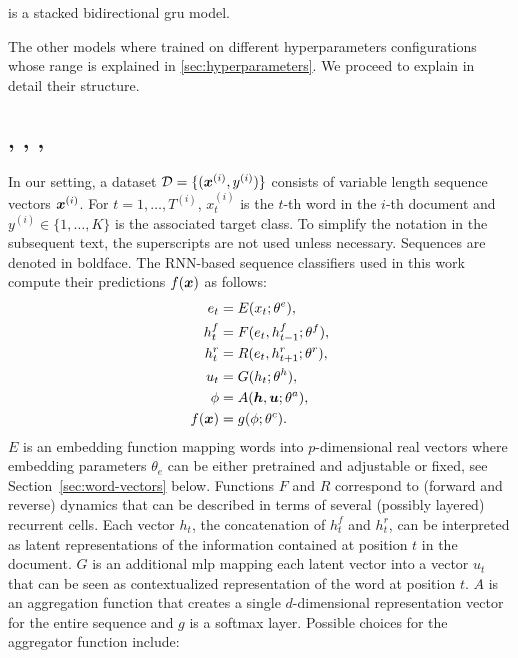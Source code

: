 \gru{} is a stacked bidirectional \ac{gru} model.

The other models where trained on different hyperparameters
configurations whose range is explained in
\cref{sec:hyperparameters}. We proceed to explain in detail their
structure.
\subsection{\maxp, \softmax, \maxi, \softmaxi}
\label{sec:model}
In our setting, a dataset $\mathcal{D}=\{(\bm{x}^{(i)},y^{(i)})\}$
consists of variable length sequence vectors $\bm{x}^{(i)}$. For
$t=1,\dots,T^{(i)}$, $x^{(i)}_t$ is the $t$-th word in the $i$-th
document and $y^{(i)}\in\{1,\dots,K\}$ is the associated target
class. To simplify the notation in the subsequent text, the
superscripts are not used unless necessary. Sequences are
denoted in boldface. The RNN-based sequence classifiers used in
this work compute their predictions $f(\bm{x})$ as follows:
\begin{align}
  e_t &= E(x_t;\theta^e),\label{eq:embed}\\
  h^f_t &= F(e_t,h^f_{t-1};\theta^f),\label{eq:maxModelRL}\\  
  h^r_t &= R(e_t,h^r_{t+1};\theta^r),\label{eq:maxModelRR}\\
  u_t &= G(h_t;\theta^h),\label{eq:maxModelF}\\
  \phi &= A(\bm{h},\bm{u};\theta^a),\label{eq:aggregation}\\
  f(\bm{x}) &= g(\phi;\theta^c).\label{eq:maxModelC}
\end{align}
$E$ is an embedding function mapping words into $p$-dimensional real
vectors where embedding parameters $\theta_e$ can be either
pretrained and adjustable or fixed, see Section~\ref{sec:word-vectors}
below.  Functions $F$ and $R$ correspond to (forward and reverse)
dynamics that can be described in terms of several (possibly layered)
recurrent cells. Each vector $h_t$,
the concatenation of $h^f_t$ and $h^r_t$, can be interpreted as latent
representations of the information contained at position $t$ in the
document. $G$ is an additional \ac{mlp} mapping each latent vector into a
vector $u_t$ that can be seen as contextualized representation of the
word at position $t$. $A$ is an aggregation function that creates a
single $d$-dimensional representation vector for the entire sequence
and $g$ is a softmax layer. Possible choices for the aggregator
function include:
